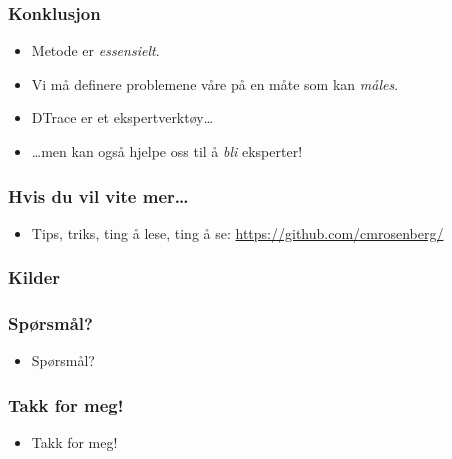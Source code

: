 \documentclass{beamer}
\begin{document}
 \begin{frame}
     \frametitle{Konklusjon}
     \begin{itemize}
         \item Metode er \emph{essensielt}.
         \item Vi må definere problemene våre på en måte som kan \emph{måles}.
         \item DTrace er et ekspertverktøy…
         \item …men kan også hjelpe oss til å \emph{bli} eksperter!
     \end{itemize}
 \end{frame}

 \begin{frame}
     \frametitle{Hvis du vil vite mer…}
     \begin{itemize}
         \item Tips, triks, ting å lese, ting å se: \url{https://github.com/cmrosenberg/}
     \end{itemize}
 \end{frame}

 \begin{frame}
     \frametitle{Kilder}
     \printbibliography{}
 \end{frame}



 \begin{frame}
     \frametitle{Spørsmål?}
     \begin{itemize}
         \item Spørsmål?
     \end{itemize}
 \end{frame}

 \begin{frame}
     \frametitle{Takk for meg!}
     \begin{itemize}
         \item Takk for meg!
     \end{itemize}
 \end{frame}
\end{document}
